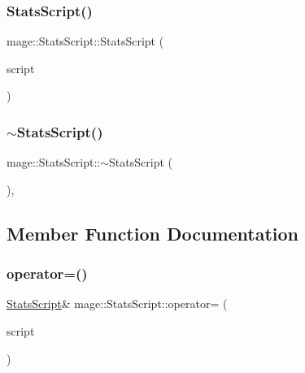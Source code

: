 \subsubsection{\texorpdfstring{Stats\+Script()}{StatsScript()}\hspace{0.1cm}{\footnotesize\ttfamily [3/3]}}
{\footnotesize\ttfamily mage\+::\+Stats\+Script\+::\+Stats\+Script (\begin{DoxyParamCaption}\item[{\hyperlink{classmage_1_1_stats_script}{Stats\+Script} \&\&}]{script }\end{DoxyParamCaption})\hspace{0.3cm}{\ttfamily [default]}}

\hypertarget{classmage_1_1_stats_script_a65ba91e19c78c99831a65ad6dd6bb149}{}\label{classmage_1_1_stats_script_a65ba91e19c78c99831a65ad6dd6bb149} 
\subsubsection{\texorpdfstring{$\sim$\+Stats\+Script()}{~StatsScript()}}
{\footnotesize\ttfamily mage\+::\+Stats\+Script\+::$\sim$\+Stats\+Script (\begin{DoxyParamCaption}{ }\end{DoxyParamCaption})\hspace{0.3cm}{\ttfamily [virtual]}, {\ttfamily [default]}}



\subsection{Member Function Documentation}
\hypertarget{classmage_1_1_stats_script_a7da39f1c0cc417dabdc539f49deec7c3}{}\label{classmage_1_1_stats_script_a7da39f1c0cc417dabdc539f49deec7c3} 
\subsubsection{\texorpdfstring{operator=()}{operator=()}\hspace{0.1cm}{\footnotesize\ttfamily [1/2]}}
{\footnotesize\ttfamily \hyperlink{classmage_1_1_stats_script}{Stats\+Script}\& mage\+::\+Stats\+Script\+::operator= (\begin{DoxyParamCaption}\item[{const \hyperlink{classmage_1_1_stats_script}{Stats\+Script} \&}]{script }\end{DoxyParamCaption})\hspace{0.3cm}{\ttfamily [delete]}}

